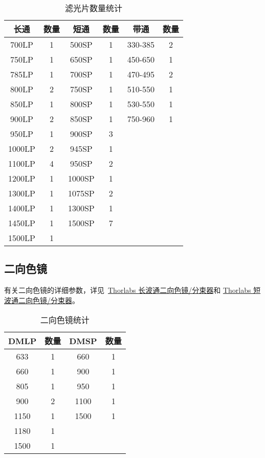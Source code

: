 \documentclass[cn,11pt,chinese]{elegantbook}
\begin{document}
\begin{table}[ht]
  \centering
  \caption{滤光片数量统计}
  \begin{tabular}{cc|cc|cc}
    \toprule
    长通&数量&短通&数量&带通&数量 \\
    \midrule
    700LP & 1     & 500SP & 1     & 330-385 & 2 \\
    750LP & 1     & 650SP & 1     & 450-650 & 1 \\
    785LP & 1     & 700SP & 1     & 470-495 & 2 \\
    800LP & 2     & 750SP & 1     & 510-550 & 1 \\
    850LP & 1     & 800SP & 1     & 530-550 & 1 \\
    900LP & 2     & 850SP & 1     & 750-960 & 1 \\
    950LP & 1     & 900SP & 3     &       &  \\
    1000LP & 2     & 945SP & 1     &       &  \\
    1100LP & 4     & 950SP & 2     &       &  \\
    1200LP & 1     & 1000SP & 1     &       &  \\
    1300LP & 1     & 1075SP & 2     &       &  \\
    1400LP & 1     & 1300SP & 1     &       &  \\
    1450LP & 1     & 1500SP & 7     &       &  \\
    1500LP & 1     &       &       &       &  \\


    \bottomrule
  \end{tabular}
  \label{tab:filter}
\end{table}

\subsection{二向色镜}
有关二向色镜的详细参数，详见~\href{https://www.thorlabschina.cn/newgrouppage9.cfm?objectgroup_id=3313}{Thorlabs 长波通二向色镜/分束器}和
\href{https://www.thorlabschina.cn/newgrouppage9.cfm?objectgroup_id=9240}{Thorlabs 短波通二向色镜/分束器}。

\begin{table}[htbp]
  \centering
  \caption{二向色镜统计}
    \begin{tabular}{cc|cc}
      \toprule
    DMLP  & 数量    & DMSP  & 数量 \\
    \midrule
    633   & 1     & 660   & 1 \\
    660   & 1     & 900   & 1 \\
    805   & 1     & 950   & 1 \\
    900   & 2     & 1100  & 1 \\
    1150  & 1     & 1500  & 1 \\
    1180  & 1     &       &  \\
    1500  & 1     &       &  \\
    
    \bottomrule
    \end{tabular}%
  \label{tab:DM}%
\end{table}%
\end{document}
